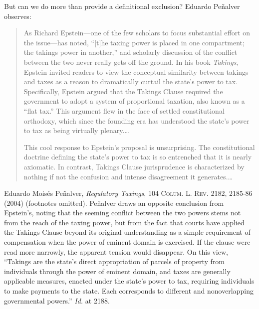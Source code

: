 But can we do more than provide a definitional exclusion? Eduardo Pe\~nalver
observes: 
\begin{quotation}
As Richard Epstein---one of the few scholars to focus substantial effort on the
issue---has noted, ``[t]he taxing power is placed in one compartment; the
takings power in another,'' and scholarly discussion of the conflict between the
two never really gets off the ground. In his book \textit{Takings}, Epstein
invited readers to view the conceptual similarity between takings and taxes as a
reason to dramatically curtail the state's power to tax. Specifically, Epstein
argued that the Takings Clause required the government to adopt a system of
proportional taxation, also known as a ``flat tax.'' This argument flew in the
face of settled constitutional orthodoxy, which since the founding era has
understood the state's power to tax as being virtually plenary.\ldots 

This cool response to Epstein's proposal is unsurprising. The constitutional
doctrine defining the state's power to tax is so entrenched that it is nearly
axiomatic. In contrast, Takings Clause jurisprudence is characterized by nothing
if not the confusion and intense disagreement it generates.\ldots
\end{quotation}
Eduardo Mois\'es Pe\~nalver, \textit{Regulatory Taxings}, 104 \textsc{Colum. L.
Rev}. 2182, 2185-86 (2004) (footnotes omitted). Pe\~nalver draws an opposite
conclusion from Epstein's, noting that the seeming conflict between the two
powers stems not from the reach of the taxing power, but from the fact that
courts have applied the Takings Clause beyond its original understanding as a
simple requirement of compensation when the power of eminent domain is
exercised. If the clause were read more narrowly, the apparent tension would
disappear. On this view, ``Takings are the state's direct appropriation of
parcels of property from individuals through the power of eminent domain, and
taxes are generally applicable measures, enacted under the state's power to tax,
requiring individuals to make payments to the state. Each corresponds to
different and nonoverlapping governmental powers.'' \textit{Id.} at 2188.

